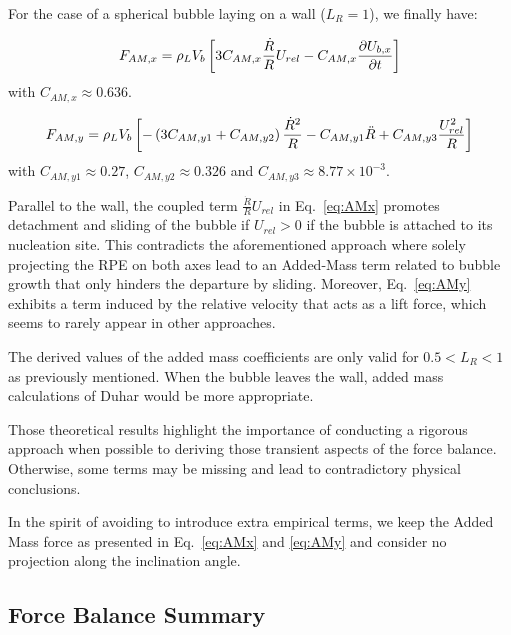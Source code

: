 For the case of a spherical bubble laying on a wall ($L_{R}=1$), we finally have:



\begin{align}
F_{AM,x}=\rho_{L}V_{b}\left[ 3C_{AM,x}\frac{\dot{R}}{R}U_{rel} - C_{AM,x}\frac{\partial{U_{b,x}}}{\partial t} \right]
\label{eq:AMx}
\end{align}
with $C_{AM,x} \approx 0.636$.


\begin{align}
F_{AM,y}=\rho_{L}V_{b}\left[ -\left( 3 C_{AM,y1} + C_{AM,y2} \right)\frac{\dot{R}^{2}}{R}-C_{AM,y1}\ddot{R} + C_{AM,y3}\frac{U_{rel}^{2}}{R} \right]
\label{eq:AMy}
\end{align}
with $C_{AM,y1} \approx 0.27$, $C_{AM,y2}\approx 0.326$ and $C_{AM,y3}\approx 8.77\times  10^{-3}$.


\npar

Parallel to the wall, the coupled term $\frac{\dot{R}}{R}U_{rel}$ in Eq.~\ref{eq:AMx} promotes detachment and sliding of the bubble if $U_{rel}>0$ \eg if the bubble is attached to its nucleation site. This contradicts the aforementioned approach where solely projecting the RPE on both axes lead to an Added-Mass term related to bubble growth that only hinders the departure by sliding. Moreover, Eq.~\ref{eq:AMy} exhibits a term induced by the relative velocity that acts as a lift force, which seems to rarely appear in other approaches.

\begin{remark*}{}
The derived values of the added mass coefficients are only valid for $0.5 < L_{R} < 1$ as previously mentioned. When the bubble leaves the wall, added mass calculations of Duhar \cite{duhar_croissance_2003} would be more appropriate.
\end{remark*}



\npar
Those theoretical results highlight the importance of conducting a rigorous approach when possible to deriving those transient aspects of the force balance. Otherwise, some terms may be missing and lead to contradictory physical conclusions. 

In the spirit of avoiding to introduce extra empirical terms, we keep the Added Mass force as presented in Eq.~\ref{eq:AMx} and \ref{eq:AMy} and consider no projection along the inclination angle.



\subsection{Force Balance Summary}\label{subsec:BdF}

